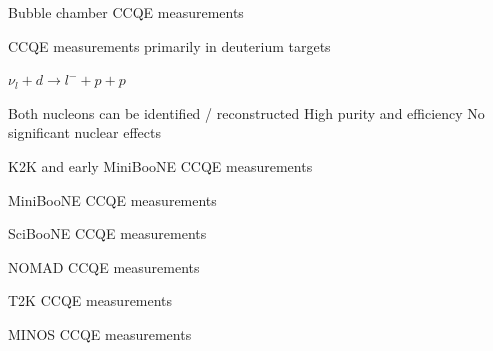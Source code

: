 %
%

\begin{frame}{Bubble chamber CCQE measurements}

CCQE measurements primarily in deuterium targets

$\nu_{l} + d \rightarrow l^{-} + p + p$

Both nucleons can be identified / reconstructed
High purity and efficiency
No significant nuclear effects

\end{frame}

%
%
%

\begin{frame}{K2K and early MiniBooNE CCQE measurements}

\end{frame}

%
%
%

\begin{frame}{MiniBooNE CCQE measurements}

\end{frame}

%
%
%

\begin{frame}{SciBooNE CCQE measurements}

\end{frame}

%
%
%

\begin{frame}{NOMAD CCQE measurements}

\end{frame}

%
%
%

\begin{frame}{T2K CCQE measurements}

\end{frame}

%
%
%

\begin{frame}{MINOS CCQE measurements}

\end{frame}


